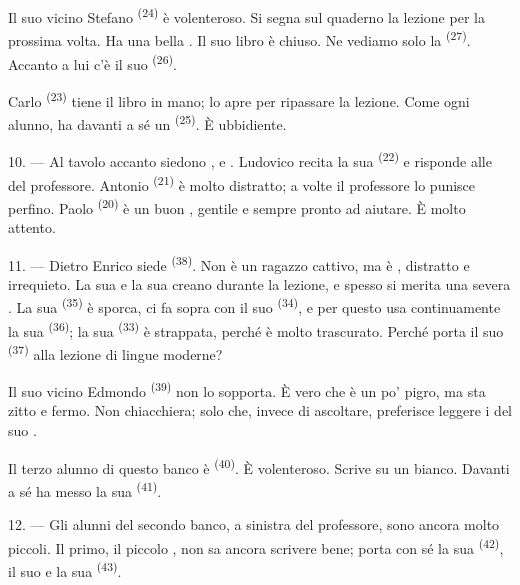 Il suo vicino Stefano \textsuperscript{(24)} è volenteroso. Si segna sul quaderno la
lezione per la prossima volta. Ha una bella . Il suo libro è
chiuso. Ne vediamo solo la  \textsuperscript{(27)}. Accanto a lui
c'è il suo  \textsuperscript{(26)}.

Carlo \textsuperscript{(23)} tiene il libro in mano; lo apre per ripassare la lezione.
Come ogni alunno, ha davanti a sé un  \textsuperscript{(25)}. È
ubbidiente.

10. --- Al tavolo accanto siedono ,  e
. Ludovico recita la sua  \textsuperscript{(22)} e
risponde alle  del professore. Antonio \textsuperscript{(21)} è molto
distratto; a volte il professore lo punisce perfino. Paolo \textsuperscript{(20)} è un
buon , gentile e sempre pronto ad aiutare. È molto attento.

\VUsaut{4.2mm}
\VUsaut{3.2mm}

11. --- Dietro Enrico siede  \textsuperscript{(38)}. Non è un ragazzo
cattivo, ma è , distratto e irrequieto. La sua
 e la sua  creano  durante
la lezione, e spesso si merita una severa . La sua
 \textsuperscript{(35)} è sporca, ci fa sopra
 con il suo  \textsuperscript{(34)}, e
per questo usa continuamente la sua  \textsuperscript{(36)}; la sua
 \textsuperscript{(33)} è strappata, perché è molto trascurato.
Perché porta il suo  \textsuperscript{(37)} alla lezione di lingue
moderne?

Il suo vicino Edmondo \textsuperscript{(39)} non lo sopporta. È vero che è un po'
pigro, ma sta zitto e fermo. Non chiacchiera; solo che, invece di ascoltare,
preferisce leggere i  del suo .

Il terzo alunno di questo banco è  \textsuperscript{(40)}. È
volenteroso. Scrive su un  bianco. Davanti a sé ha messo la
sua  \textsuperscript{(41)}.

12. --- Gli alunni del secondo banco, a sinistra del professore, sono ancora molto
piccoli. Il primo, il piccolo , non sa ancora scrivere bene; porta con
sé la sua  \textsuperscript{(42)}, il suo  e la
sua  \textsuperscript{(43)}.

